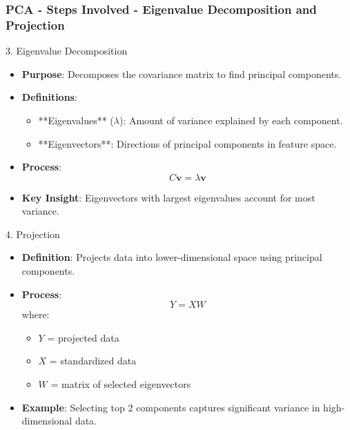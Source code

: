\documentclass{beamer}
\begin{document}
\begin{frame}[fragile]
    \frametitle{PCA - Steps Involved - Eigenvalue Decomposition and Projection}
    \begin{block}{3. Eigenvalue Decomposition}
        \begin{itemize}
            \item \textbf{Purpose}: Decomposes the covariance matrix to find principal components.
            \item \textbf{Definitions}:
            \begin{itemize}
                \item **Eigenvalues** (\(\lambda\)): Amount of variance explained by each component.
                \item **Eigenvectors**: Directions of principal components in feature space.
            \end{itemize}
            \item \textbf{Process}:
            \begin{equation}
            C \mathbf{v} = \lambda \mathbf{v}
            \end{equation}
            \item \textbf{Key Insight}: Eigenvectors with largest eigenvalues account for most variance.
        \end{itemize}
    \end{block}

    \begin{block}{4. Projection}
        \begin{itemize}
            \item \textbf{Definition}: Projects data into lower-dimensional space using principal components.
            \item \textbf{Process}:
            \begin{equation}
            Y = XW
            \end{equation}
            where:
            \begin{itemize}
                \item \(Y\) = projected data
                \item \(X\) = standardized data
                \item \(W\) = matrix of selected eigenvectors
            \end{itemize}
            \item \textbf{Example}: Selecting top 2 components captures significant variance in high-dimensional data.
        \end{itemize}
    \end{block}
\end{frame}
\end{document}
